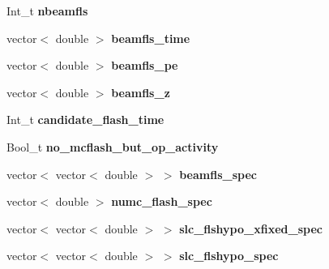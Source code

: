 \begin{DoxyCompactItemize}
\item 
\hypertarget{classUBXSecEvent_a2bf72740213db9d50d45c603eb3c549e}{Int\-\_\-t {\bfseries nbeamfls}}\label{classUBXSecEvent_a2bf72740213db9d50d45c603eb3c549e}

\item 
\hypertarget{classUBXSecEvent_aff5ca08ec3a193029979e23b73d49d85}{vector$<$ double $>$ {\bfseries beamfls\-\_\-time}}\label{classUBXSecEvent_aff5ca08ec3a193029979e23b73d49d85}

\item 
\hypertarget{classUBXSecEvent_a3d703c077ccb0b00cacd04c6e751a2eb}{vector$<$ double $>$ {\bfseries beamfls\-\_\-pe}}\label{classUBXSecEvent_a3d703c077ccb0b00cacd04c6e751a2eb}

\item 
\hypertarget{classUBXSecEvent_ac30df357368262d7a103ae9cd0bbd0d3}{vector$<$ double $>$ {\bfseries beamfls\-\_\-z}}\label{classUBXSecEvent_ac30df357368262d7a103ae9cd0bbd0d3}

\item 
\hypertarget{classUBXSecEvent_a84ab9cf932fabd0e1d9762ac07c75407}{Int\-\_\-t {\bfseries candidate\-\_\-flash\-\_\-time}}\label{classUBXSecEvent_a84ab9cf932fabd0e1d9762ac07c75407}

\item 
\hypertarget{classUBXSecEvent_a04fd3fd872cbe4f19ea0c438214ee854}{Bool\-\_\-t {\bfseries no\-\_\-mcflash\-\_\-but\-\_\-op\-\_\-activity}}\label{classUBXSecEvent_a04fd3fd872cbe4f19ea0c438214ee854}

\item 
\hypertarget{classUBXSecEvent_a672e817e5a574c0a1ff50ec81862bc1f}{vector$<$ vector$<$ double $>$ $>$ {\bfseries beamfls\-\_\-spec}}\label{classUBXSecEvent_a672e817e5a574c0a1ff50ec81862bc1f}

\item 
\hypertarget{classUBXSecEvent_aa51dba44fd0d9dcfbeb4c455b73debbd}{vector$<$ double $>$ {\bfseries numc\-\_\-flash\-\_\-spec}}\label{classUBXSecEvent_aa51dba44fd0d9dcfbeb4c455b73debbd}

\item 
\hypertarget{classUBXSecEvent_aff42f5975ca8b7c22f21023ffe8cf2c9}{vector$<$ vector$<$ double $>$ $>$ {\bfseries slc\-\_\-flshypo\-\_\-xfixed\-\_\-spec}}\label{classUBXSecEvent_aff42f5975ca8b7c22f21023ffe8cf2c9}

\item 
\hypertarget{classUBXSecEvent_aa82aa9b73994eae31d0f7ab0f47f23fa}{vector$<$ vector$<$ double $>$ $>$ {\bfseries slc\-\_\-flshypo\-\_\-spec}}\label{classUBXSecEvent_aa82aa9b73994eae31d0f7ab0f47f23fa}


\end{DoxyCompactItemize}
